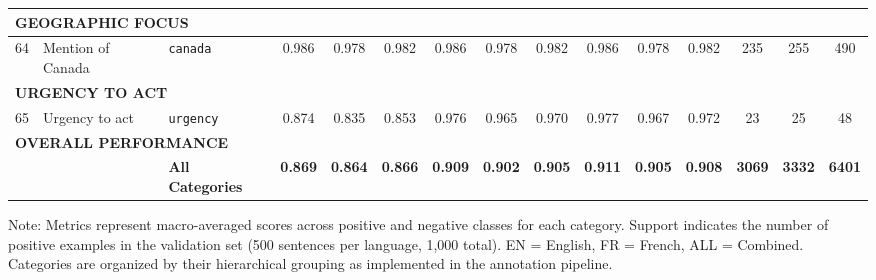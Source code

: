 \documentclass[12pt]{article}
\renewcommand\_{\texttt{\detokenize{_}\allowbreak}}
\begin{document}
{\begin{longtable}{p{0.4cm}p{4.0cm}p{3.0cm}cccccccccccc}
\midrule
\multicolumn{15}{l}{\cellcolor{gray!10}\textbf{GEOGRAPHIC FOCUS}} \\
\midrule
64 & Mention of Canada & \texttt{canada} & 0.986 & 0.978 & 0.982 & 0.986 & 0.978 & 0.982 & 0.986 & 0.978 & 0.982 & 235 & 255 & 490 \\
\midrule
\multicolumn{15}{l}{\cellcolor{gray!10}\textbf{URGENCY TO ACT}} \\
\midrule
65 & Urgency to act & \texttt{urgency} & 0.874 & 0.835 & 0.853 & 0.976 & 0.965 & 0.970 & 0.977 & 0.967 & 0.972 & 23 & 25 & 48 \\
\midrule
\multicolumn{15}{l}{\cellcolor{gray!20}\textbf{OVERALL PERFORMANCE}} \\
& & \textbf{All Categories} & \textbf{0.869} & \textbf{0.864} & \textbf{0.866} & \textbf{0.909} & \textbf{0.902} & \textbf{0.905} & \textbf{0.911} & \textbf{0.905} & \textbf{0.908} & \textbf{3069} & \textbf{3332} & \textbf{6401} \\
\bottomrule
\end{longtable}
}

\vspace{0.5em}
\noindent\footnotesize
Note: Metrics represent macro-averaged scores across positive and negative classes for each category. Support indicates the number of positive examples in the validation set (500 sentences per language, 1,000 total). EN = English, FR = French, ALL = Combined. Categories are organized by their hierarchical grouping as implemented in the annotation pipeline.
\endlandscape
\end{document}
